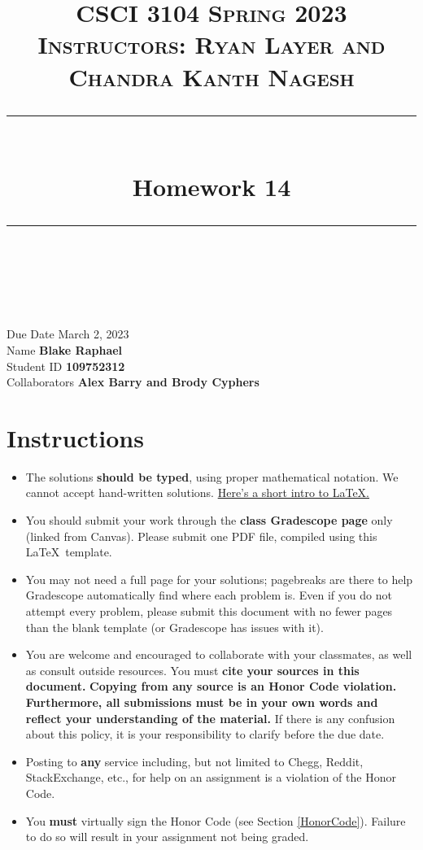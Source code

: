 \documentclass[11pt]{article}
\title{
\normalfont \normalsize 
\textsc{CSCI 3104 Spring 2023 \\ 
Instructors: Ryan Layer and Chandra Kanth Nagesh} \\
[10pt] 
\rule{\linewidth}{0.5pt} \\[6pt] 
\huge Homework 14 \\
\rule{\linewidth}{2pt}  \\[10pt]
}
\author{}
\date{}
\theoremstyle{definition}
\theoremstyle{definition}
\theoremstyle{definition}
\begin{document}

\maketitle


\noindent
Due Date \dotfill March 2, 2023 \\
Name \dotfill \textbf{Blake Raphael} \\
Student ID \dotfill \textbf{109752312} \\
Collaborators \dotfill \textbf{Alex Barry and Brody Cyphers}

\tableofcontents

\section{Instructions}
 \begin{itemize}
	\item The solutions \textbf{should be typed}, using proper mathematical notation. We cannot accept hand-written solutions. \href{http://ece.uprm.edu/~caceros/latex/introduction.pdf}{Here's a short intro to \LaTeX.}
	\item You should submit your work through the \textbf{class Gradescope page} only (linked from Canvas). Please submit one PDF file, compiled using this \LaTeX \ template.
	\item You may not need a full page for your solutions; pagebreaks are there to help Gradescope automatically find where each problem is. Even if you do not attempt every problem, please submit this document with no fewer pages than the blank template (or Gradescope has issues with it).

	\item You are welcome and encouraged to collaborate with your classmates, as well as consult outside resources. You must \textbf{cite your sources in this document.} \textbf{Copying from any source is an Honor Code violation. Furthermore, all submissions must be in your own words and reflect your understanding of the material.} If there is any confusion about this policy, it is your responsibility to clarify before the due date. 

	\item Posting to \textbf{any} service including, but not limited to Chegg, Reddit, StackExchange, etc., for help on an assignment is a violation of the Honor Code.

	\item You \textbf{must} virtually sign the Honor Code (see Section \ref{HonorCode}). Failure to do so will result in your assignment not being graded.
\end{itemize}
\end{document}

